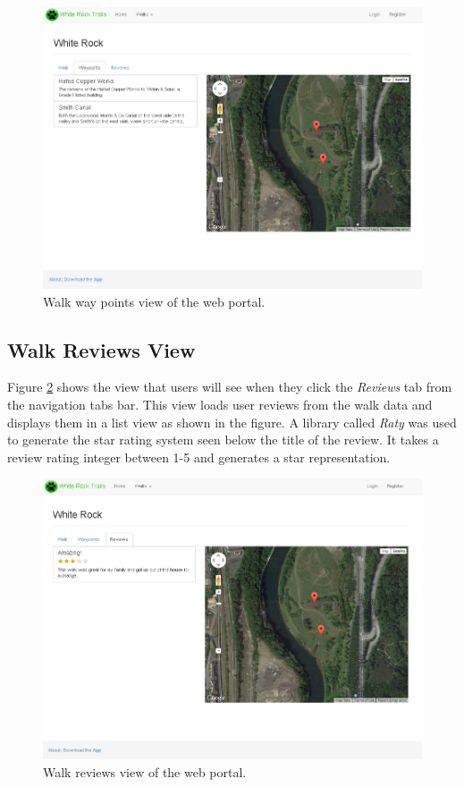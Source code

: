 \documentclass[11pt,a4paper]{article}
\begin{document}
\begin{figure}[H]
\centering
\includegraphics[width=0.8\linewidth]{./img/webportal/walk-waypoints}
\caption{Walk way points view of the web portal.}
\label{fig:walk-waypoints}
\end{figure}

\subsection{Walk Reviews View}

Figure \ref{fig:walk-reviews} shows the view that users will see when they click the \emph{Reviews} tab from the navigation tabs bar. This view loads user reviews from the walk data and displays them in a list view as shown in the figure. A library called \emph{Raty} was used to generate the star rating system seen below the title of the review. It takes a review rating integer between 1-5 and generates a star representation.

\begin{figure}[H]
\centering
\includegraphics[width=0.8\linewidth]{./img/webportal/walk-reviews}
\caption{Walk reviews view of the web portal.}
\label{fig:walk-reviews}
\end{figure}
\end{document}
